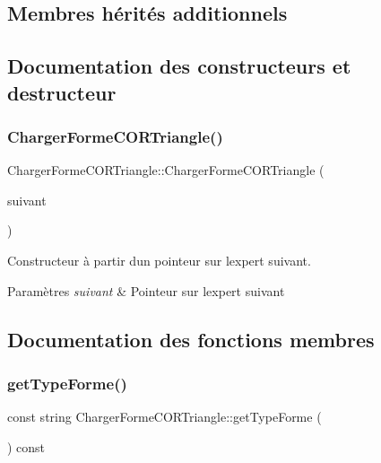 \subsection*{Membres hérités additionnels}


\subsection{Documentation des constructeurs et destructeur}
\mbox{\label{class_charger_forme_c_o_r_triangle_ab0e825f083ba91bd938d982b5217ca8e}} 
\subsubsection{\texorpdfstring{ChargerFormeCORTriangle()}{ChargerFormeCORTriangle()}}
{\footnotesize\ttfamily Charger\+Forme\+C\+O\+R\+Triangle\+::\+Charger\+Forme\+C\+O\+R\+Triangle (\begin{DoxyParamCaption}\item[{\mbox{\hyperlink{class_charger_forme_c_o_r}{Charger\+Forme\+C\+OR}} $\ast$}]{suivant }\end{DoxyParamCaption})}



Constructeur à partir d\textquotesingle{}un pointeur sur l\textquotesingle{}expert suivant. 


\begin{DoxyParams}{Paramètres}
{\em suivant} & Pointeur sur l\textquotesingle{}expert suivant \\
\hline
\end{DoxyParams}


\subsection{Documentation des fonctions membres}
\mbox{\label{class_charger_forme_c_o_r_triangle_a7a0271b76c6abea8c67be2c920d72925}} 
\subsubsection{\texorpdfstring{getTypeForme()}{getTypeForme()}}
{\footnotesize\ttfamily const string Charger\+Forme\+C\+O\+R\+Triangle\+::get\+Type\+Forme (\begin{DoxyParamCaption}{ }\end{DoxyParamCaption}) const\hspace{0.3cm}{\ttfamily [virtual]}}




